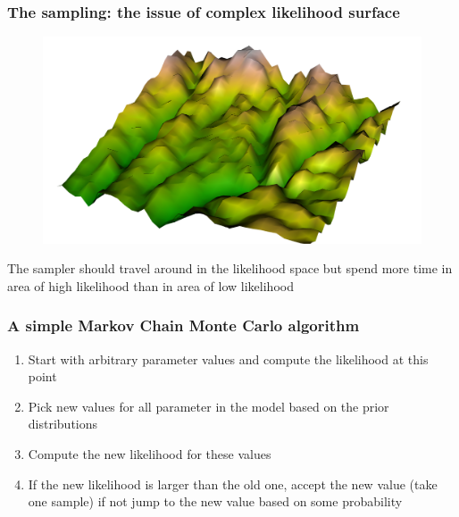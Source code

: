 \documentclass{beamer}
\begin{document}
  \begin{frame}
  \frametitle{\bf The sampling: the issue of complex likelihood surface}
  
  
  \begin{figure}
   \includegraphics[width=\textwidth,height=.7\textheight,keepaspectratio]{like_surf.png}
  \end{figure}

  {\scriptsize The sampler should travel around in the likelihood space but spend more time in area of high likelihood than in area of low likelihood}
  
  
 \end{frame}
 
 \begin{frame}
  \frametitle{\bf A simple Markov Chain Monte Carlo algorithm}
  
  \begin{enumerate}
   \item Start with arbitrary parameter values and compute the likelihood at this point
   \item Pick new values for all parameter in the model based on the prior distributions
   \item Compute the new likelihood for these values
   \item If the new likelihood is larger than the old one, accept the new value (take one sample) if not jump to the new value based on some probability
  \end{enumerate}

  
  
 \end{frame}
 
\end{document}
